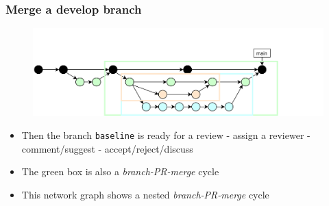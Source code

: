 \documentclass[aspectratio=169]{beamer} %
\begin{document}
\begin{frame}
	\frametitle{Merge a develop branch}

	\vspace{-.5cm}
	\begin{minipage}[t][5cm][t]{\textwidth}
		\begin{figure}
			\centering
			\includegraphics[width=\textwidth]{./img/dime-gitflow-network-2-6.png}
		\end{figure}
	\end{minipage}

	\vspace{-.5cm}
	\begin{minipage}[t][5cm][t]{\textwidth}
		\begin{itemize}
			\setlength\itemsep{.5em}
			\item Then the branch \texttt{baseline} is ready for a review
			- assign a reviewer - comment/suggest - accept/reject/discuss
			\item The green box is also a \textit{branch-PR-merge} cycle
			\item This network graph shows
			a nested \textit{branch-PR-merge} cycle
		\end{itemize}
	\end{minipage}
\end{frame}
\end{document}

